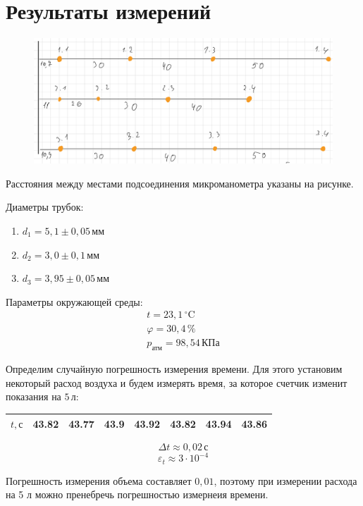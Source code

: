 \section{Результаты измерений}

\begin{figure}[ht!]
    \centering\includegraphics[width=0.8\linewidth]{img/eq2.png}
\end{figure}

Расстояния между местами подсоединения микроманометра указаны на рисунке.

Диаметры трубок:
\begin{enumerate}
    \item $d_1=5{,}1\pm 0{,}05\,\text{мм}$
    \item $d_2=3{,}0\pm 0{,}1\,\text{мм}$
    \item $d_3=3{,}95\pm 0{,}05\,\text{мм}$
\end{enumerate}

Параметры окружающей среды:
\begin{gather}
    t=23{,}1\,^\circ \mathrm{C} \\
    \varphi = 30{,}4\,\% \\
    p_\text{атм} = 98{,}54\,\text{КПа}
\end{gather}

Определим случайную погрешность измерения времени. Для этого установим некоторый расход
воздуха и будем измерять время, за которое счетчик изменит показания на $5\,\text{л}$:
\begin{table}[ht!]
    \centering
\begin{tabular}{|l|l|l|l|l|l|l|l|}
    \hline
    $t,\text{с}$ & 43.82 & 43.77 & 43.9 & 43.92 & 43.82 & 43.94 & 43.86 \\ \hline
    \end{tabular}
\end{table}

\[\Delta t\approx 0{,}02\,\text{с}\]
\[\varepsilon_t\approx 3\cdot 10^{-4}\]

Погрешность измерения объема составляет $0{,}01$, поэтому при измерении расхода на 5 л можно
пренебречь погрешностью измернеия времени.

